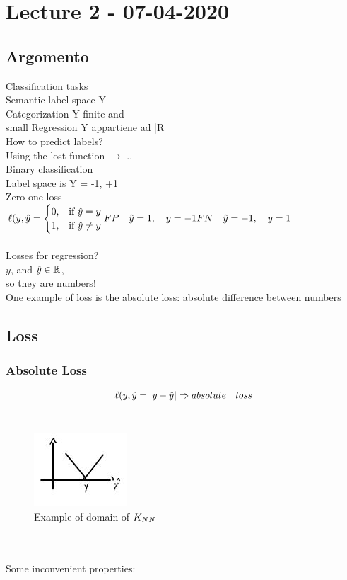 \documentclass[../main.tex]{subfiles}
\begin{document}
\chapter{Lecture 2 - 07-04-2020}

\section{Argomento}
Classification tasks\\
Semantic label space Y\\
Categorization Y finite and\\ small
Regression Y appartiene ad |R\\
How to predict labels?\\
Using the lost function $\rightarrow$ ..\\
Binary classification\\
Label space is Y = { -1, +1 }\\
Zero-one loss\\

$
\ell(y,\hat{y} = \begin{cases} 0, & \mbox{if } \hat{y} = y 
\\ 1, & 
\mbox{if }\hat{y} \neq y
\end{cases}
\\\\
FP \quad \hat{y} = 1,\quad y = -1\\
FN \quad \hat{y} = -1, \quad y = 1
$
\\\\
Losses for regression?\\
$y$, and $\hat{y} \in \mathbb{R}$, \\so they are numbers!\\
One example of loss is the absolute loss: absolute difference between numbers\\
\section{Loss}
\subsection{Absolute Loss}
$$\ell(y,\hat{y} = | y - \hat{y} |  \Rightarrow absolute \quad loss\\ $$
\\
\begin{figure}[h]
    \centering
    \includegraphics[width=0.4\linewidth]{../img/lez2-img1.JPG}
    \caption{Example of domain of $K_{NN}$}
\end{figure}\\
\\
Some inconvenient properties:
\end{document}
